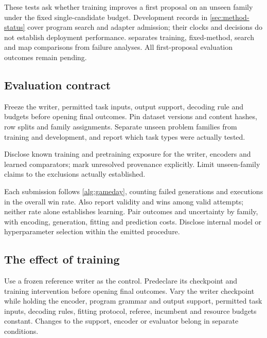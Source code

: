 These tests ask whether training improves a first proposal on an unseen
family under the fixed single-candidate budget. Development records
in \cref{sec:method-status} cover program search and adapter admission;
their clocks and decisions do not establish deployment performance.
 separates training, fixed-method, search and
map comparisons from failure analyses. All first-proposal evaluation outcomes remain pending.

\subsection{Evaluation contract}\label{sub:results-protocol}

Freeze the writer, permitted task inputs, output support, decoding rule and
budgets before opening final outcomes. Pin dataset versions and content
hashes, row splits and family assignments. Separate unseen problem
families from training and development, and report which task types were
actually tested.

Disclose known training and pretraining exposure for the writer, encoders
and learned comparators; mark unresolved provenance explicitly.
Limit unseen-family claims to the exclusions actually established.

Each \EZ{} submission follows \cref{alg:gameday}, counting failed generations
and executions in the overall win rate. Also report validity and wins among
valid attempts; neither rate alone establishes learning. Pair outcomes
and uncertainty by family, with encoding, generation, fitting and prediction
costs. Disclose internal model or hyperparameter selection within the emitted procedure.

\subsection{The effect of training}\label{sub:results-learning}

Use a frozen reference writer as the control.
Predeclare its checkpoint and training intervention before opening final
outcomes. Vary the writer checkpoint while holding the encoder, program
grammar and output support, permitted task inputs, decoding rules, fitting
protocol, referee, incumbent and resource budgets constant. Changes to the
support, encoder or evaluator belong in separate conditions.

